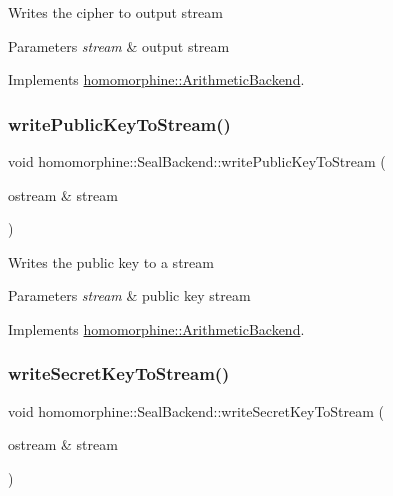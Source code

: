 Writes the cipher to output stream


\begin{DoxyParams}{Parameters}
{\em stream} & output stream \\
\hline
\end{DoxyParams}


Implements \mbox{\hyperlink{classhomomorphine_1_1_arithmetic_backend_a659d4f63a1020d942d561b7fa5e9eddf}{homomorphine\+::\+Arithmetic\+Backend}}.

\mbox{\label{classhomomorphine_1_1_seal_backend_af09735f0304cc28e6dc967938a4ad277}} 
\subsubsection{\texorpdfstring{writePublicKeyToStream()}{writePublicKeyToStream()}}
{\footnotesize\ttfamily void homomorphine\+::\+Seal\+Backend\+::write\+Public\+Key\+To\+Stream (\begin{DoxyParamCaption}\item[{ostream \&}]{stream }\end{DoxyParamCaption})\hspace{0.3cm}{\ttfamily [virtual]}}

Writes the public key to a stream


\begin{DoxyParams}{Parameters}
{\em stream} & public key stream \\
\hline
\end{DoxyParams}


Implements \mbox{\hyperlink{classhomomorphine_1_1_arithmetic_backend_a2552b81a08e286969a0ff44428d59af4}{homomorphine\+::\+Arithmetic\+Backend}}.

\mbox{\label{classhomomorphine_1_1_seal_backend_ab3420695131ae4c2a3891917480ddacf}} 
\subsubsection{\texorpdfstring{writeSecretKeyToStream()}{writeSecretKeyToStream()}}
{\footnotesize\ttfamily void homomorphine\+::\+Seal\+Backend\+::write\+Secret\+Key\+To\+Stream (\begin{DoxyParamCaption}\item[{ostream \&}]{stream }\end{DoxyParamCaption})\hspace{0.3cm}{\ttfamily [virtual]}}

